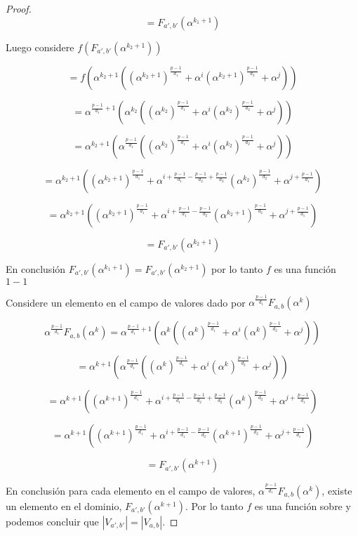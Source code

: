 \documentclass{article}
\theoremstyle{definition}
\theoremstyle{remark}
\numberwithin{equation}{section}
\begin{document}
\begin{proof}
  $$= F_{a', b'}(\alpha^{k_1+1})$$

  Luego considere $f(F_{a', b'}(\alpha^{k_2+1}))$

  $$= f(\alpha^{k_2+1}((\alpha^{k_2+1})^{\frac{p-1}{d_1}} + \alpha^{i}(\alpha^{k_2+1})^{\frac{p-1}{d_2}} + \alpha^{j}))$$

  $$ = \alpha^{\frac{p-1}{d_1}+1}(\alpha^{k_2}((\alpha^{k_2})^{\frac{p-1}{d_1}} + \alpha^{i}(\alpha^{k_2})^{\frac{p-1}{d_2}} + \alpha^{j}))$$

  $$ = \alpha^{k_2+1}(\alpha^{\frac{p-1}{d_1}}((\alpha^{k_2})^{\frac{p-1}{d_1}} + \alpha^{i}(\alpha^{k_2})^{\frac{p-1}{d_2}} + \alpha^{j}))$$

  $$ = \alpha^{k_2+1}((\alpha^{k_2 + 1})^{\frac{p-1}{d_1}} + \alpha^{i + \frac{p-1}{d_1} - \frac{p-1}{d_2} + \frac{p-1}{d_2}}(\alpha^{k_2})^{\frac{p-1}{d_2}} + \alpha^{j + \frac{p-1}{d_1}})$$

  $$= \alpha^{k_2+1}((\alpha^{k_2 + 1})^{\frac{p-1}{d_1}} + \alpha^{i + \frac{p-1}{d_1} - \frac{p-1}{d_2}}(\alpha^{k_2 + 1})^{\frac{p-1}{d_2}} + \alpha^{j + \frac{p-1}{d_1}})$$

  $$= F_{a', b'}(\alpha^{k_2+1})$$

  En conclusi\'on $F_{a', b'}(\alpha^{k_1+1}) = F_{a', b'}(\alpha^{k_2+1})$ por lo tanto $f$ es una funci\'on $1-1$

  Considere un elemento en el campo de valores dado por $\alpha^{\frac{p-1}{d_1}}F_{a, b}(\alpha^k)$

  $$\alpha^{\frac{p-1}{d_1}}F_{a, b}(\alpha^k) = \alpha^{\frac{p-1}{d_1}+1}(\alpha^{k}((\alpha^{k})^{\frac{p-1}{d_1}} + \alpha^{i}(\alpha^{k})^{\frac{p-1}{d_2}} + \alpha^{j}))$$

  $$ = \alpha^{k+1}(\alpha^{\frac{p-1}{d_1}}((\alpha^{k})^{\frac{p-1}{d_1}} + \alpha^{i}(\alpha^{k})^{\frac{p-1}{d_2}} + \alpha^{j}))$$

  $$ = \alpha^{k+1}((\alpha^{k + 1})^{\frac{p-1}{d_1}} + \alpha^{i + \frac{p-1}{d_1} - \frac{p-1}{d_2} + \frac{p-1}{d_2}}(\alpha^{k})^{\frac{p-1}{d_2}} + \alpha^{j + \frac{p-1}{d_1}})$$

  $$= \alpha^{k+1}((\alpha^{k + 1})^{\frac{p-1}{d_1}} + \alpha^{i + \frac{p-1}{d_1} - \frac{p-1}{d_2}}(\alpha^{k + 1})^{\frac{p-1}{d_2}} + \alpha^{j + \frac{p-1}{d_1}})$$

  $$= F_{a', b'}(\alpha^{k+1})$$

  En conclusi\'on para cada elemento en el campo de valores, $\alpha^{\frac{p-1}{d_1}}F_{a, b}(\alpha^k)$, existe un elemento en el dominio, $F_{a', b'}(\alpha^{k+1})$. Por lo tanto $f$ es una funci\'on sobre y podemos concluir que $|V_{a', b'}| = |V_{a, b}|$.

\end{proof}
\end{document}
